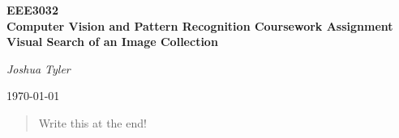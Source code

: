 




	
\hypersetup{pageanchor=false} %

	
\begin{titlepage}
	\centering
	{\huge\bfseries EEE3032 \\ Computer Vision and Pattern Recognition Coursework Assignment \\ Visual Search of an Image Collection \par}
	\vspace{1cm}

	\vspace{2.5cm}
	{\Large\itshape Joshua Tyler \par}
	\vfill
	
	
	{\large \today\par}
\end{titlepage}

\clearpage
\begingroup
\let\titlepage\relax
\let\vfil\relax
\let\endtitlepage\relax
\let\clearpage\relax

\begin{abstract}
	Write this at the end!
\end{abstract}

\vspace{50pt}
\tableofcontents
\endgroup

\clearpage %

\hypersetup{pageanchor=true}



\clearpage







          

